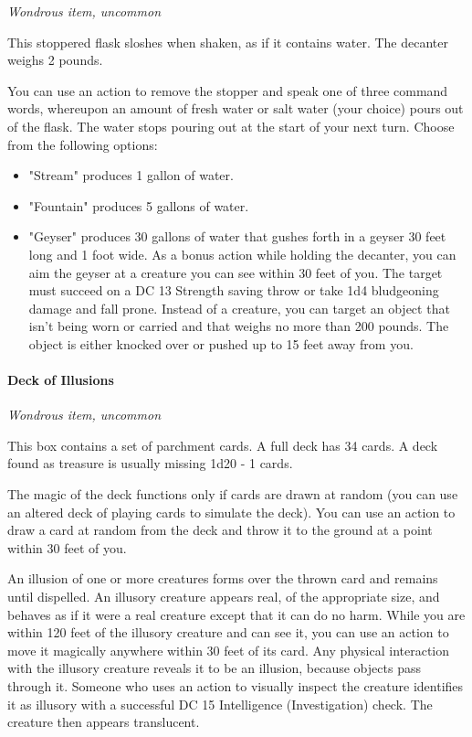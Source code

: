 \documentclass[
]{article}
\providecommand{\tightlist}{%
  \setlength{\itemsep}{0pt}\setlength{\parskip}{0pt}}
\begin{document}
\emph{Wondrous item, uncommon}

This stoppered flask sloshes when shaken, as if it contains water. The
decanter weighs 2 pounds.

You can use an action to remove the stopper and speak one of three
command words, whereupon an amount of fresh water or salt water (your
choice) pours out of the flask. The water stops pouring out at the start
of your next turn. Choose from the following options:

\begin{itemize}
\tightlist
\item
  "Stream" produces 1 gallon of water.
\item
  "Fountain" produces 5 gallons of water.
\item
  "Geyser" produces 30 gallons of water that gushes forth in a geyser 30
  feet long and 1 foot wide. As a bonus action while holding the
  decanter, you can aim the geyser at a creature you can see within 30
  feet of you. The target must succeed on a DC 13 Strength saving throw
  or take 1d4 bludgeoning damage and fall prone. Instead of a creature,
  you can target an object that isn't being worn or carried and that
  weighs no more than 200 pounds. The object is either knocked over or
  pushed up to 15 feet away from you.
\end{itemize}

\hypertarget{deck-of-illusions}{%
\paragraph{Deck of Illusions}\label{deck-of-illusions}}

\emph{Wondrous item, uncommon}

This box contains a set of parchment cards. A full deck has 34 cards. A
deck found as treasure is usually missing 1d20 - 1 cards.

The magic of the deck functions only if cards are drawn at random (you
can use an altered deck of playing cards to simulate the deck). You can
use an action to draw a card at random from the deck and throw it to the
ground at a point within 30 feet of you.

An illusion of one or more creatures forms over the thrown card and
remains until dispelled. An illusory creature appears real, of the
appropriate size, and behaves as if it were a real creature except that
it can do no harm. While you are within 120 feet of the illusory
creature and can see it, you can use an action to move it magically
anywhere within 30 feet of its card. Any physical interaction with the
illusory creature reveals it to be an illusion, because objects pass
through it. Someone who uses an action to visually inspect the creature
identifies it as illusory with a successful DC 15 Intelligence
(Investigation) check. The creature then appears translucent.
\end{document}
